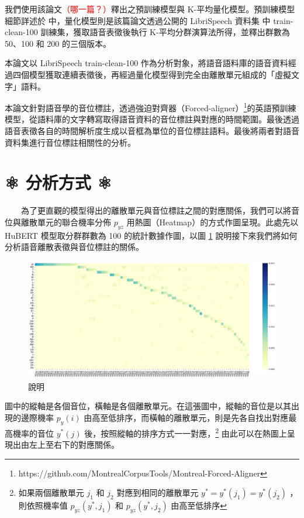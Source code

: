 {        我們使用該論文\textcolor{red}{（哪一篇？）}釋出之預訓練模型與 K-平均量化模型。預訓練模型細節詳述於 \cite{lakhotia_generative_2021-1} 中，量化模型則是該篇論文透過公開的 LibriSpeech 資料集 \cite{panayotov_librispeech_2015} 中 train-clean-100 訓練集，獲取語音表徵後執行 K-平均分群演算法所得，並釋出群數為 50、100 和 200 的三個版本。

        本論文以 LibriSpeech train-clean-100 作為分析對象，將語音語料庫的語音資料經過四個模型獲取連續表徵後，再經過量化模型得到完全由離散單元組成的「虛擬文字」語料。

        本論文針對語音學的音位標註，透過強迫對齊器（Forced-aligner）\footnote{https://github.com/MontrealCorpusTools/Montreal-Forced-Aligner}的英語預訓練模型，從語料庫的文字轉寫取得語音資料的音位標註與對應的時間範圍。最後透過語音表徵各自的時間解析度生成以音框為單位的音位標註語料。最後將兩者對語音資料集進行音位標註相關性的分析。



}
\section{⚛️ 分析方式 ⚛️}

　　為了更直觀的模型得出的離散單元與音位標註之間的對應關係，我們可以將音位與離散單元的聯合機率分佈 $p_{yz}$ 用熱圖（Heatmap）的方式作圖呈現。此處先以 HuBERT 模型取分群群數為 100 的統計數據作圖，以圖 \ref{fig:joint-byprob-hub100} 說明接下來我們將如何分析語音離散表徵與音位標註的關係。

\begin{figure}
    \centering
    \includegraphics[width=0.75\linewidth]{figures/joint_sortby_prphn-hub-100.png}
    \caption{說明}
    \label{fig:joint-byprob-hub100}
\end{figure}
        圖中的縱軸是各個音位，橫軸是各個離散單元。在這張圖中，縱軸的音位是以其出現的邊際機率 $p_y(i)$ 由高至低排序，而橫軸的離散單元，則是先各自找出對應最高機率的音位 $y^\ast(j)$ 後，按照縱軸的排序方式一一對應，\footnote{如果兩個離散單元 $j_1$ 和 $j_2$ 對應到相同的離散單元 $y^\ast = y^\ast(j_1) = y^\ast(j_2)$ ，則依照機率值 $p_{yz}(y^\ast, j_1)$ 和 $p_{yz}(y^\ast, j_2)$ 由高至低排序} 由此可以在熱圖上呈現出由左上至右下的對應關係。

